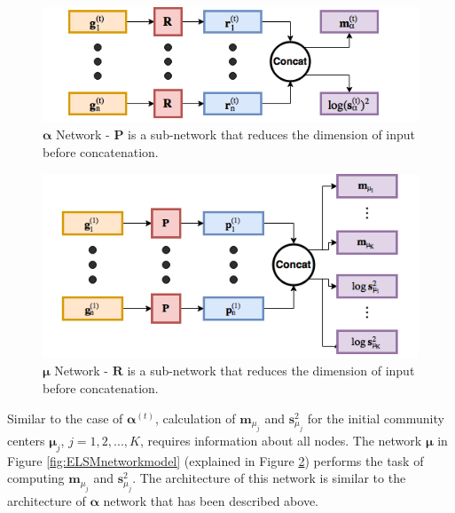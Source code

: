 \documentclass[letterpaper]{article} %
\begin{document}
\begin{figure}
\begin{center}
\centering
\includegraphics[width=\columnwidth]{alpha_network}
\caption{$\bm{\alpha}$ Network - $\mathbf{P}$ is a sub-network that reduces the dimension of input before concatenation.}
\label{fig:ELSMalphanetwork}
\end{center}
\end{figure}

\begin{figure}
\begin{center}
\centering
\includegraphics[width=\columnwidth]{mu_network}
\caption{$\bm{\mu}$ Network - $\mathbf{R}$ is a sub-network that reduces the dimension of input before concatenation.}
\label{fig:ELSMmunetwork}
\end{center}
\end{figure}

Similar to the case of $\bm{\alpha}^{(t)}$, calculation of $\mathbf{m}_{\mu_j}$ and $\mathbf{s}_{\mu_j}^2$ for the initial community centers $\bm{\mu}_j$, $j = 1, 2, ..., {K}$, requires information about all nodes. The network $\bm{\mu}$ in Figure \ref{fig:ELSMnetworkmodel} (explained in Figure \ref{fig:ELSMmunetwork}) performs the task of computing  $\mathbf{m}_{\mu_j}$ and $\mathbf{s}_{\mu_j}^2$. The architecture of this network is similar to the architecture of $\bm{\alpha}$ network that has been described above.
\end{document}
